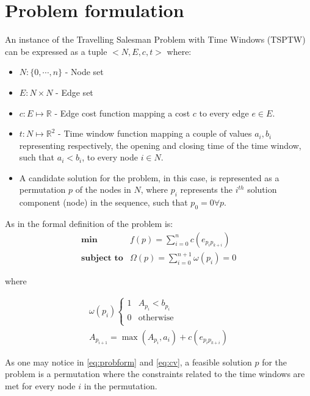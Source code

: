 \documentclass{article}
\begin{document}
\section{Problem formulation}
An instance of the Travelling Salesman Problem with Time Windows (TSPTW) can be expressed as a tuple $<N,E,c,t>$ where:
\begin{itemize}
  \item $N:\{0,\cdots,n\}$ - Node set 
  \item $E:N\times N$ - Edge set
  \item $c:E\mapsto \mathbb{R}$ - Edge cost function mapping a cost $c$ to every edge $e \in E$. 
  \item $t:N\mapsto \mathbb{R}^2$ - Time window function mapping a couple of values $a_i,b_i$ representing respectively, the opening and closing time of the time window, such that $a_i<b_i$, to every node $i \in N$.
  \item A candidate solution for the problem, in this case, is represented as a permutation $p$ of the nodes in $N$, where $p_i$ represents the $i^{th}$ solution component (node) in the sequence, such that $p_0 = 0 \forall p$.
\end{itemize}

As in \cite{lopez2010beam} the formal definition of the problem is:
\begin{equation} \label{eq:probform}
 \begin{array}{rl}
  \textbf{min} & f(p)= \sum\limits_{i=0}^{n} c(e_{p_{i}p_{k+i}}) \\
  \textbf{subject to} & \Omega(p)= \sum\limits_{i=0}^{n+1} \omega(p_{i}) = 0
 \end{array}
\end{equation}

where

\begin{equation} \label{eq:cv}
\begin{array}{c}
 \omega(p_{i}) \begin{cases}
                1 & A_{p_i} < b_{p_i}  \\
                0 & \text{otherwise} \\   
               \end{cases} \\
 A_{p_{i+1}} = \max(A_{p_i},a_i) + c(e_{p_{i}p_{k+i}}) 
\end{array}
\end{equation}

As one may notice in \ref{eq:probform} and \ref{eq:cv}, a feasible solution $p$ for the problem is a permutation where the constraints related to the time windows are met for every node $i$ in the permutation.
\end{document}

